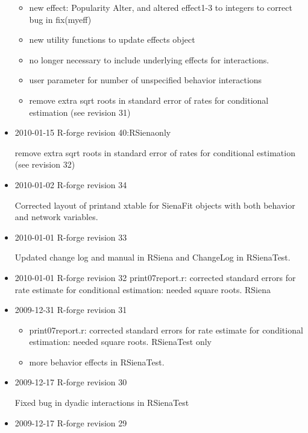 \documentclass[a4paper,fleqn,11pt]{article}
\newcommand{\+}{\, + \,}
\newcommand{\sfn}[1]{\textsf{#1}}
\begin{document}
\begin{small}
\begin{itemize}
\begin{itemize}
\item
   new effect: Popularity Alter, and altered effect1-3 to integers to correct
  bug in fix(myeff)
  \item new utility functions to update effects object
  \item no longer
  necessary to include underlying effects for interactions.
  \item user parameter for number of unspecified behavior interactions
  \item  remove extra sqrt roots in standard error of rates for conditional
  estimation (see revision 31)
\end{itemize}
\item 2010-01-15 R-forge revision 40:\textsf{RSiena}only

  remove extra sqrt roots in standard error of rates for conditional
  estimation (see revision 32)


\item 2010-01-02 R-forge revision 34

  Corrected layout of \textsf{print}and \sfn{xtable} for \sfn{SienaFit} objects
  with both behavior and network variables.

\item 2010-01-01 R-forge revision 33

Updated change log and manual in \textsf{RSiena} and \sfn{ChangeLog} in \textsf{RSienaTest}.

\item 2010-01-01 R-forge revision 32
    print07report.r: corrected standard errors for rate estimate for
    conditional estimation: needed square roots. RSiena

\item 2009-12-31 R-forge revision 31
\begin{itemize}
\item
    print07report.r: corrected standard errors for rate estimate for
    conditional estimation: needed square roots. \textsf{RSienaTest} only

\item more behavior effects in \textsf{RSienaTest}.
\end{itemize}

\item 2009-12-17 R-forge revision 30

Fixed bug in dyadic interactions in \textsf{RSienaTest}

\item 2009-12-17 R-forge revision 29


\end{itemize}
\end{small}
\end{document}
